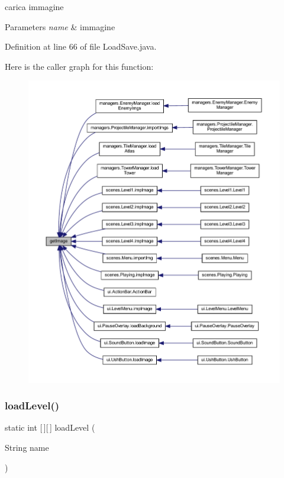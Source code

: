 carica immagine 


\begin{DoxyParams}{Parameters}
{\em name} & immagine \\
\hline
\end{DoxyParams}


Definition at line 66 of file Load\+Save.\+java.

Here is the caller graph for this function\+:
\nopagebreak
\begin{figure}[H]
\begin{center}
\leavevmode
\includegraphics[width=350pt]{classhelpz_1_1_load_save_adfcdec0c763af178ffbfea94f4ccd263_icgraph}
\end{center}
\end{figure}
\mbox{\label{classhelpz_1_1_load_save_a9dbd50db72db31e6a9c5c423d4e48be3}} 
\subsubsection{\texorpdfstring{load\+Level()}{loadLevel()}}
{\footnotesize\ttfamily static int \mbox{[}$\,$\mbox{]}\mbox{[}$\,$\mbox{]} load\+Level (\begin{DoxyParamCaption}\item[{String}]{name }\end{DoxyParamCaption})\hspace{0.3cm}{\ttfamily [static]}}



